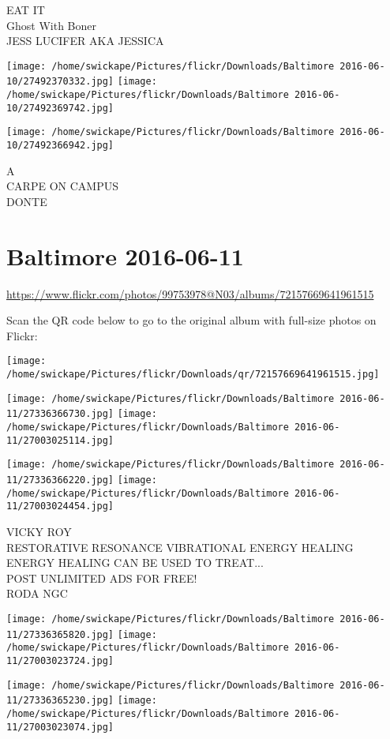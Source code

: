\documentclass[10pt,letterpaper]{article}
\begin{document}
EAT IT\\
Ghost With Boner\\
JESS LUCIFER AKA JESSICA
\pagebreak

\texttt{[image: /home/swickape/Pictures/flickr/Downloads/Baltimore 2016-06-10/27492370332.jpg]}
\texttt{[image: /home/swickape/Pictures/flickr/Downloads/Baltimore 2016-06-10/27492369742.jpg]}

\texttt{[image: /home/swickape/Pictures/flickr/Downloads/Baltimore 2016-06-10/27492366942.jpg]}

A\\
CARPE ON CAMPUS\\
DONTE
\pagebreak

\section*{Baltimore 2016-06-11}

\url{https://www.flickr.com/photos/99753978@N03/albums/72157669641961515}

Scan the QR code below to go to the original album with full-size photos on Flickr:

\texttt{[image: /home/swickape/Pictures/flickr/Downloads/qr/72157669641961515.jpg]}
\pagebreak

\texttt{[image: /home/swickape/Pictures/flickr/Downloads/Baltimore 2016-06-11/27336366730.jpg]}
\texttt{[image: /home/swickape/Pictures/flickr/Downloads/Baltimore 2016-06-11/27003025114.jpg]}

\texttt{[image: /home/swickape/Pictures/flickr/Downloads/Baltimore 2016-06-11/27336366220.jpg]}
\texttt{[image: /home/swickape/Pictures/flickr/Downloads/Baltimore 2016-06-11/27003024454.jpg]}

VICKY ROY\\
RESTORATIVE RESONANCE VIBRATIONAL ENERGY HEALING ENERGY HEALING CAN BE USED TO TREAT...\\
POST UNLIMITED ADS FOR FREE!\\
RODA NGC
\pagebreak

\texttt{[image: /home/swickape/Pictures/flickr/Downloads/Baltimore 2016-06-11/27336365820.jpg]}
\texttt{[image: /home/swickape/Pictures/flickr/Downloads/Baltimore 2016-06-11/27003023724.jpg]}

\texttt{[image: /home/swickape/Pictures/flickr/Downloads/Baltimore 2016-06-11/27336365230.jpg]}
\texttt{[image: /home/swickape/Pictures/flickr/Downloads/Baltimore 2016-06-11/27003023074.jpg]}
\end{document}
